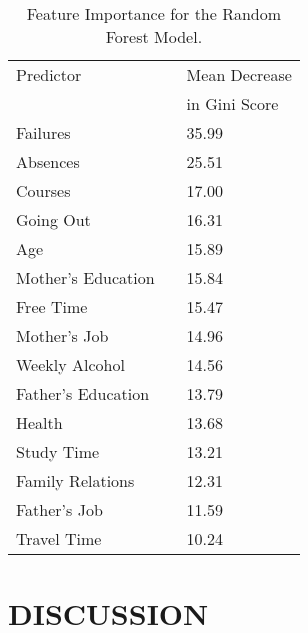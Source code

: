 \documentclass[sigconf]{acmart}
\begin{document}
\begin{table}
  \caption{Feature Importance for the Random Forest Model.}
  \label{tab:freq}
  \begin{tabular}{lll}
    \toprule
    Predictor&  & Mean Decrease  \\    
             &  & in Gini Score  \\
    \midrule
    Failures            &  &  35.99 \\
    Absences            &  &  25.51 \\
    Courses             &  &  17.00 \\ 
    Going Out           &  &  16.31 \\
    Age                 &  &  15.89 \\
    Mother's Education  &  &  15.84 \\
    Free Time           &  &  15.47 \\
    Mother's Job        &  &  14.96 \\
    Weekly Alcohol      &  &  14.56 \\
    Father's Education  &  &  13.79 \\
    Health              &  &  13.68 \\
    Study Time          &  &  13.21 \\ 
    Family Relations    &  &  12.31 \\
    Father's Job        &  &  11.59 \\
    Travel Time         &  &  10.24 \\
    \bottomrule
  \end{tabular}
\end{table}







\section{DISCUSSION}
\end{document}
